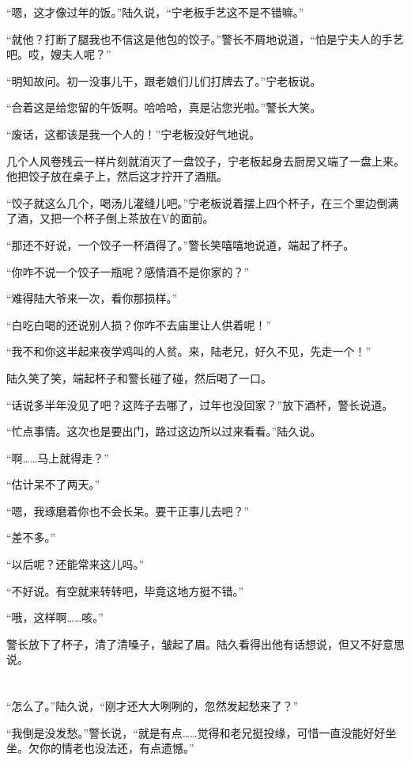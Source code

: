 “嗯，这才像过年的饭。”陆久说，“宁老板手艺这不是不错嘛。”

“就他？打断了腿我也不信这是他包的饺子。”警长不屑地说道，“怕是宁夫人的手艺吧。哎，嫂夫人呢？”

“明知故问。初一没事儿干，跟老娘们儿们打牌去了。”宁老板说。

“合着这是给您留的午饭啊。哈哈哈，真是沾您光啦。”警长大笑。

“废话，这都该是我一个人的！”宁老板没好气地说。

几个人风卷残云一样片刻就消灭了一盘饺子，宁老板起身去厨房又端了一盘上来。他把饺子放在桌子上，然后这才拧开了酒瓶。

“饺子就这么几个，喝汤儿灌缝儿吧。”宁老板说着摆上四个杯子，在三个里边倒满了酒，又把一个杯子倒上茶放在V的面前。

“那还不好说，一个饺子一杯酒得了。”警长笑嘻嘻地说道，端起了杯子。

“你咋不说一个饺子一瓶呢？感情酒不是你家的？”

“难得陆大爷来一次，看你那损样。”

“白吃白喝的还说别人损？你咋不去庙里让人供着呢！”

“我不和你这半起来夜学鸡叫的人贫。来，陆老兄，好久不见，先走一个！”

陆久笑了笑，端起杯子和警长碰了碰，然后喝了一口。

“话说多半年没见了吧？这阵子去哪了，过年也没回家？”放下酒杯，警长说道。

“忙点事情。这次也是要出门，路过这边所以过来看看。”陆久说。

“啊……马上就得走？”

“估计呆不了两天。”

“嗯，我琢磨着你也不会长呆。要干正事儿去吧？”

“差不多。”

“以后呢？还能常来这儿吗。”

“不好说。有空就来转转吧，毕竟这地方挺不错。”

“哦，这样啊……咳。”

警长放下了杯子，清了清嗓子，皱起了眉。陆久看得出他有话想说，但又不好意思说。

\section*{}

“怎么了。”陆久说，“刚才还大大咧咧的，忽然发起愁来了？”

“我倒是没发愁。”警长说，“就是有点……觉得和老兄挺投缘，可惜一直没能好好坐坐。欠你的情老也没法还，有点遗憾。”


